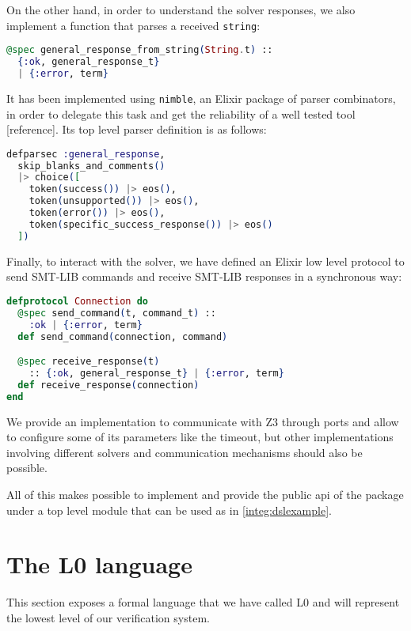 On the other hand, in order to understand the solver responses, we also implement
a function that parses a received \verb|string|:

\begin{lstlisting}[language=elixir,numbers=none,frame=none]
@spec general_response_from_string(String.t) :: 
  {:ok, general_response_t} 
  | {:error, term}
\end{lstlisting}

It has been implemented using \verb|nimble|, an Elixir package of parser
combinators, in order to delegate this task and get the reliability of a well
tested tool [reference]. Its top level parser definition is as follows:

\begin{lstlisting}[language=elixir,numbers=none,frame=none]
defparsec :general_response,
  skip_blanks_and_comments()
  |> choice([
    token(success()) |> eos(),
    token(unsupported()) |> eos(),
    token(error()) |> eos(),
    token(specific_success_response()) |> eos()
  ])
\end{lstlisting}

Finally, to interact with the solver, we have defined an Elixir low level protocol
to send SMT-LIB commands and receive SMT-LIB responses in a synchronous way:

\begin{lstlisting}[language=elixir,numbers=none,frame=none]
defprotocol Connection do
  @spec send_command(t, command_t) :: 
    :ok | {:error, term}
  def send_command(connection, command)

  @spec receive_response(t) 
    :: {:ok, general_response_t} | {:error, term}
  def receive_response(connection)
end
\end{lstlisting}

We provide an implementation to communicate with Z3 through ports and allow to configure
some of its parameters like the timeout, but other implementations involving different
solvers and communication mechanisms should also be possible.

All of this makes possible to implement and provide the public \gls{api} of the 
package under a top level module that can be used as in \ref{integ:dslexample}.

\section{The L0 language}

This section exposes a formal language that we have called L0 and will
represent the lowest level of our verification system.

